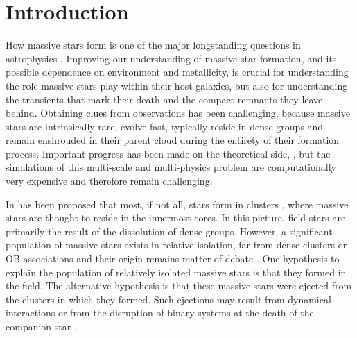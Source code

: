 \documentclass[apjl,twocolumn]{emulateapj}
\begin{document}
\maketitle{}

\section{Introduction}
\label{sec:intro}

How massive stars form is one of the major longstanding questions in astrophysics
\citep[e.g.,][]{zinnecker:07}. Improving our understanding of massive star formation, and its
possible dependence on environment and metallicity, is crucial for understanding the role massive stars play within their host galaxies, but also for understanding the transients that mark their death and the compact remnants they leave behind.
%
Obtaining clues from observations has been challenging, because massive stars are intrinsically rare, 
evolve fast, typically reside in dense groups and remain enshrouded in
their parent cloud during the entirety of their formation
process. Important progress has been made on the theoretical side,
\citep[e.g.][]{bate:09,kuiper:15,rosen:16}, but the simulations of this multi-scale and multi-physics problem are computationally very expensive and therefore remain challenging.  

In has been proposed that most, if not all, stars form in clusters \citep{lada:03}, where massive stars are thought to reside in the innermost cores. In this picture, field stars are primarily the result of the dissolution of dense groups.  However, a significant population of massive stars exists in relative isolation, far from dense clusters or OB associations and their origin remains matter of debate \citep{gvaramadze:12, lamb:16,ward:18}.   One hypothesis to explain the population of relatively isolated massive stars is that they formed in the field. The alternative hypothesis is that these massive stars were ejected from the clusters in which they formed.  Such ejections may result from dynamical interactions \citep[e.g.,][]{poveda:67} or from the disruption of binary systems at the death of the companion  star \citep[e.g.,][]{zwicky:57, blaauw:61, renzo:18}. 
 
\end{document}
